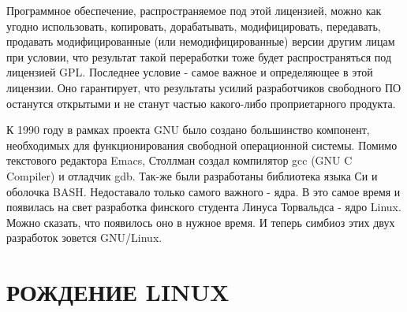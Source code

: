 \documentclass[bachelor, och, referat, times]{SCWorks}
\begin{document}
\par Программное обеспечение, распространяемое под этой лицензией, можно 
как угодно использовать, копировать, дорабатывать, модифицировать, 
передавать, продавать модифицированные (или немодифицированные) версии 
другим лицам при условии, что результат такой переработки тоже будет 
распространяться под лицензией GPL. Последнее условие - самое важное и 
определяющее в этой лицензии. Оно гарантирует, что результаты усилий 
разработчиков свободного ПО останутся открытыми и не станут частью 
какого-либо проприетарного продукта.

\par К 1990 году в рамках проекта GNU было создано большинство компонент, 
необходимых для функционирования свободной операционной системы. Помимо 
текстового редактора Emacs, Столлман создал компилятор gcc (GNU C 
Compiler) и отладчик gdb. Так-же были разработаны библиотека языка Си и 
оболочка BASH. Недоставало только самого важного - ядра. В это самое время
и появилась на свет разработка финского студента Линуса Торвальдса - ядро 
Linux. Можно сказать, что появилось оно в нужное время. И теперь симбиоз 
этих двух разработок зовется GNU/Linux.

\section{РОЖДЕНИЕ LINUX}
\end{document}
